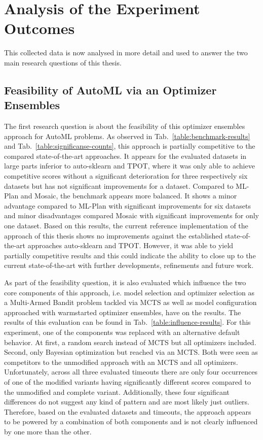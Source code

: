 \section{Analysis of the Experiment Outcomes}
\label{sec:evaluation:analysis}
This collected data is now analysed in more detail and used to answer the two main research questions of this thesis.

\subsection{Feasibility of AutoML via an Optimizer Ensembles}
\label{sec:evaluation:analysis:feasibility}
The first research question is about the feasibility of this optimizer ensembles approach for AutoML problems.\newline
As observed in Tab.~\ref{table:benchmark-results} and Tab.~\ref{table:significanse-counts}, this approach is partially competitive to the compared state-of-the-art approaches.
It appears for the evaluated datasets in large parts inferior to auto-sklearn and TPOT, where it was only able to achieve competitive scores without a significant deterioration for three respectively six datasets but has not significant improvements for a dataset.
Compared to ML-Plan and Mosaic, the benchmark appears more balanced.
It shows a minor advantage compared to ML-Plan with significant improvements for six datasets and minor disadvantages compared Mosaic with significant improvements for only one dataset.\newline
Based on this results, the current reference implementation of the approach of this thesis shows no improvements against the established state-of-the-art approaches auto-sklearn and TPOT.
However, it was able to yield partially competitive results and this could indicate the ability to close up to the current state-of-the-art with further developments, refinements and future work.

As part of the feasibility question, it is also evaluated which influence the two core components of this approach, i.e. model selection and optimizer selection as a Multi-Armed Bandit problem tackled via MCTS as well as model configuration approached with warmstarted optimizer ensembles, have on the results.
The results of this evaluation can be found in Tab.~\ref{table:influence-results}.\newline
For this experiment, one of the components was replaced with an alternative default behavior.
At first, a random search instead of MCTS but all optimizers included.
Second, only Bayesian optimization but reached via an MCTS.
Both were seen as competitors to the unmodified approach with an MCTS and all optimizers.\newline
Unfortunately, across all three evaluated timeouts there are only four occurrences of one of the modified variants having significantly different scores compared to the unmodified and complete variant.
Additionally, these four significant differences do not suggest any kind of pattern and are most likely just outliers.
Therefore, based on the evaluated datasets and timeouts, the approach appears to be powered by a combination of both components and is not clearly influenced by one more than the other.

